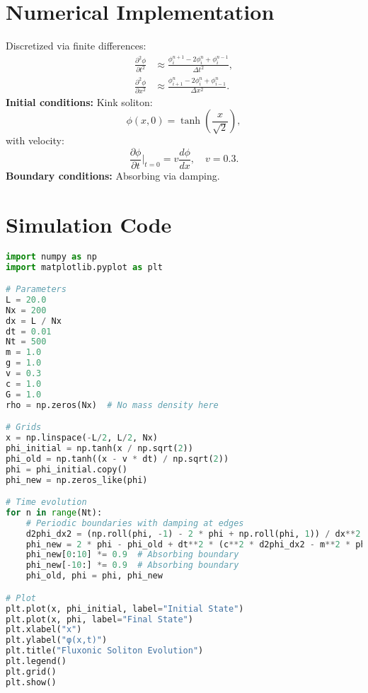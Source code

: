 \documentclass{article}
\begin{document}
\section{Numerical Implementation}
Discretized via finite differences:
\begin{align}
\frac{\partial^2 \phi}{\partial t^2} &\approx \frac{\phi^{n+1}_i - 2\phi^n_i + \phi^{n-1}_i}{\Delta t^2}, \\
\frac{\partial^2 \phi}{\partial x^2} &\approx \frac{\phi^n_{i+1} - 2\phi^n_i + \phi^n_{i-1}}{\Delta x^2}.
\end{align}
\textbf{Initial conditions:} Kink soliton:
\begin{equation}
\phi(x, 0) = \tanh\left(\frac{x}{\sqrt{2}}\right),
\end{equation}
with velocity:
\begin{equation}
\frac{\partial \phi}{\partial t} \bigg|_{t=0} = v \frac{d\phi}{dx}, \quad v = 0.3.
\end{equation}
\textbf{Boundary conditions:} Absorbing via damping.

\section{Simulation Code}
\begin{lstlisting}[language=Python, caption=Fluxonic Soliton Evolution Simulation, label=lst:soliton]
import numpy as np
import matplotlib.pyplot as plt

# Parameters
L = 20.0
Nx = 200
dx = L / Nx
dt = 0.01
Nt = 500
m = 1.0
g = 1.0
v = 0.3
c = 1.0
G = 1.0
rho = np.zeros(Nx)  # No mass density here

# Grids
x = np.linspace(-L/2, L/2, Nx)
phi_initial = np.tanh(x / np.sqrt(2))
phi_old = np.tanh((x - v * dt) / np.sqrt(2))
phi = phi_initial.copy()
phi_new = np.zeros_like(phi)

# Time evolution
for n in range(Nt):
    # Periodic boundaries with damping at edges
    d2phi_dx2 = (np.roll(phi, -1) - 2 * phi + np.roll(phi, 1)) / dx**2
    phi_new = 2 * phi - phi_old + dt**2 * (c**2 * d2phi_dx2 - m**2 * phi - g * phi**3 + 8 * np.pi * G * rho)
    phi_new[0:10] *= 0.9  # Absorbing boundary
    phi_new[-10:] *= 0.9  # Absorbing boundary
    phi_old, phi = phi, phi_new

# Plot
plt.plot(x, phi_initial, label="Initial State")
plt.plot(x, phi, label="Final State")
plt.xlabel("x")
plt.ylabel("φ(x,t)")
plt.title("Fluxonic Soliton Evolution")
plt.legend()
plt.grid()
plt.show()
\end{lstlisting}
\end{document}

